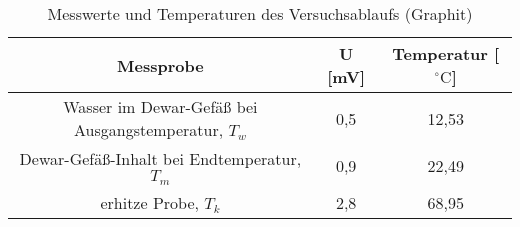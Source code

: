 \begin{table}[h]
	\begin{center}
		\begin{tabular}{ccc}
			Messprobe & U [mV] & Temperatur [$^{\circ}\mathrm{C}$]\\ \hline
			Wasser im Dewar-Gefäß bei Ausgangstemperatur, $T_w$& 0,5 & 12,53\\
			Dewar-Gefäß-Inhalt bei Endtemperatur, $T_m$&0,9&22,49\\
			erhitze Probe, $T_k$&2,8&68,95
		\end{tabular}
		\caption{Messwerte und Temperaturen des Versuchsablaufs (Graphit)}
		\label{tabgraphit1}
	\end{center}
\end{table}